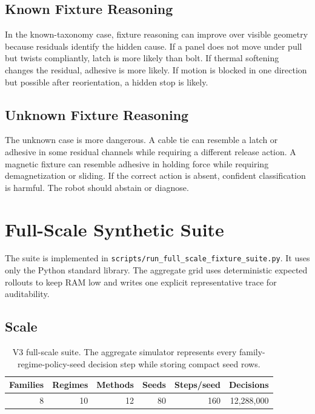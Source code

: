 \documentclass{article}
\begin{document}
\subsection{Known Fixture Reasoning}

In the known-taxonomy case, fixture reasoning can improve over visible
geometry because residuals identify the hidden cause. If a panel does not move
under pull but twists compliantly, latch is more likely than bolt. If thermal
softening changes the residual, adhesive is more likely. If motion is blocked
in one direction but possible after reorientation, a hidden stop is likely.

\subsection{Unknown Fixture Reasoning}

The unknown case is more dangerous. A cable tie can resemble a latch or
adhesive in some residual channels while requiring a different release action.
A magnetic fixture can resemble adhesive in holding force while requiring
demagnetization or sliding. If the correct action is absent, confident
classification is harmful. The robot should abstain or diagnose.

\section{Full-Scale Synthetic Suite}

The suite is implemented in
\texttt{scripts/run\_full\_scale\_fixture\_suite.py}. It uses only the Python
standard library. The aggregate grid uses deterministic expected rollouts to
keep RAM low and writes one explicit representative trace for auditability.

\subsection{Scale}

\begin{table}[t]
\centering
\small
\caption{V3 full-scale suite. The aggregate simulator represents every
family-regime-policy-seed decision step while storing compact seed rows.}
\label{tab:scale}
\begin{tabular}{rrrrrr}
\toprule
Families & Regimes & Methods & Seeds & Steps/seed & Decisions \\
\midrule
8 & 10 & 12 & 80 & 160 & 12,288,000 \\
\bottomrule
\end{tabular}
\end{table}
\end{document}

